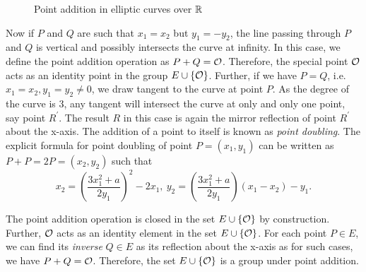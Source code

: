 \begin{figure}
\begin{center}
    \end{center}
    \caption{Point addition in elliptic curves over $\mathbb{R}$}
    \label{fig:point_add}
\end{figure}

Now if $P$ and $Q$ are such that $x_1 = x_2$ but $y_1 = -y_2$, the line passing through $P$ and $Q$ is vertical and possibly intersects the curve at infinity.
In this case, we define the point addition operation as $P + Q = \mathcal{O}$.
Therefore, the special point $\mathcal{O}$ acts as an identity point in the group $E \cup \{\mathcal{O}\}$.
Further, if we have $P=Q$, i.e. $x_1 = x_2, y_1 = y_2 \neq 0$, we draw tangent to the curve at point $P$.
As the degree of the curve is 3, any tangent will intersect the curve at only and only one point, say point $R^{\prime}$.
The result $R$ in this case is again the mirror reflection of point $R^{\prime}$ about the x-axis. 
The addition of a point to itself is known as \textit{point doubling}. 
The explicit formula for point doubling of point $P=(x_1,y_1)$ can be written as $P+P = 2P = (x_2, y_2)$ such that
\begin{equation}
    x_2 = \left( \frac{3x_1^2 + a}{2y_1} \right)^2 - 2x_1, \ y_2 = \left( \frac{3x_1^2 + a}{2y_1} \right)(x_1-x_2) - y_1.
    \label{eqn:point_double}
\end{equation}

The point addition operation is closed in the set $E \cup \{\mathcal{O}\}$ by construction. 
Further, $\mathcal{O}$ acts as an identity element in the set $E \cup \{\mathcal{O}\}$.
For each point $P \in E$, we can find its \textit{inverse} $Q \in E$ as its reflection about the x-axis as for such cases, we have $P+Q = \mathcal{O}$.
Therefore, the set $E \cup \{\mathcal{O}\}$ is a group under point addition.

